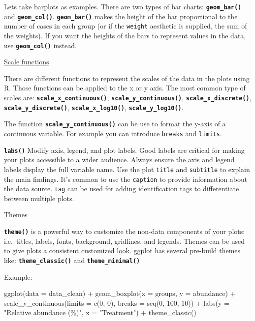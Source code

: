 \documentclass[
  letterpaper,
  DIV=11,
  numbers=noendperiod]{scrartcl}
\newenvironment{Shaded}{\begin{snugshade}}{\end{snugshade}}
\newcommand{\AttributeTok}[1]{\textcolor[rgb]{0.40,0.45,0.13}{#1}}
\newcommand{\DecValTok}[1]{\textcolor[rgb]{0.68,0.00,0.00}{#1}}
\newcommand{\FunctionTok}[1]{\textcolor[rgb]{0.28,0.35,0.67}{#1}}
\newcommand{\NormalTok}[1]{\textcolor[rgb]{0.00,0.23,0.31}{#1}}
\newcommand{\SpecialCharTok}[1]{\textcolor[rgb]{0.37,0.37,0.37}{#1}}
\newcommand{\StringTok}[1]{\textcolor[rgb]{0.13,0.47,0.30}{#1}}
\begin{document}
Lets take barplots as examples. There are two types of bar charts:
\textbf{\texttt{geom\_bar()}} and \textbf{\texttt{geom\_col()}}.
\textbf{\texttt{geom\_bar()}} makes the height of the bar proportional
to the number of cases in each group (or if the \texttt{weight}
aesthetic is supplied, the sum of the weights). If you want the heights
of the bars to represent values in the data, use
\textbf{\texttt{geom\_col()}} instead.

\uline{Scale functions}

There are different functions to represent the scales of the data in the
plots using R. Those functions can be applied to the x or y axis. The
most common type of scales are:
\textbf{\texttt{scale\_x\_continuous()}},
\textbf{\texttt{scale\_y\_continuous()}},
\textbf{\texttt{scale\_x\_discrete()}},
\textbf{\texttt{scale\_y\_discrete()}},
\textbf{\texttt{scale\_x\_log10()}},
\textbf{\texttt{scale\_y\_log10()}}.

The function \textbf{\texttt{scale\_y\_continuous()}} can be use to
format the y-axis of a continuous variable. For example you can
introduce \texttt{breaks} and \texttt{limits}.

\textbf{\texttt{labs()}} Modify axis, legend, and plot labels. Good
labels are critical for making your plots accessible to a wider
audience. Always ensure the axis and legend labels display the full
variable name. Use the plot \texttt{title} and \texttt{subtitle} to
explain the main findings. It's common to use the \texttt{caption} to
provide information about the data source. \texttt{tag} can be used for
adding identification tags to differentiate between multiple plots.

\uline{Themes}

\textbf{\texttt{theme()}} is a powerful way to customize the non-data
components of your plots: i.e.~titles, labels, fonts, background,
gridlines, and legends. Themes can be used to give plots a consistent
customized look. ggplot has several pre-build themes like:
\textbf{\texttt{theme\_classic()}} and
\textbf{\texttt{theme\_minimal()}}

Example:

\begin{Shaded}
\begin{Highlighting}[]
\FunctionTok{ggplot}\NormalTok{(}\AttributeTok{data =}\NormalTok{ data\_clean) }\SpecialCharTok{+}
  \FunctionTok{geom\_boxplot}\NormalTok{(}\AttributeTok{x =}\NormalTok{ groups,}
               \AttributeTok{y =}\NormalTok{ abundance) }\SpecialCharTok{+}
  \FunctionTok{scale\_y\_continuous}\NormalTok{(}\AttributeTok{limits =} \FunctionTok{c}\NormalTok{(}\DecValTok{0}\NormalTok{, }\DecValTok{0}\NormalTok{),}
                     \AttributeTok{breaks =} \FunctionTok{seq}\NormalTok{(}\DecValTok{0}\NormalTok{, }\DecValTok{100}\NormalTok{, }\DecValTok{10}\NormalTok{)) }\SpecialCharTok{+}
  \FunctionTok{labs}\NormalTok{(}\AttributeTok{y =} \StringTok{"Relative abundance (\%)"}\NormalTok{,}
       \AttributeTok{x =} \StringTok{"Treatment"}\NormalTok{) }\SpecialCharTok{+}
  \FunctionTok{theme\_classic}\NormalTok{()}
\end{Highlighting}
\end{Shaded}
\end{document}
